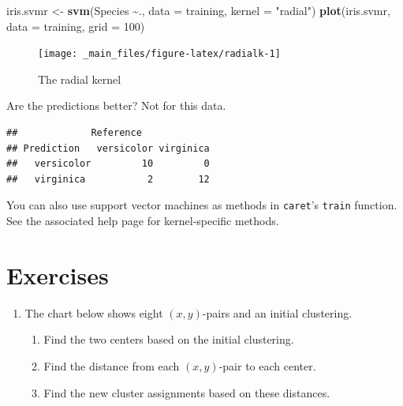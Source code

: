 \documentclass[
]{book}
\newenvironment{Shaded}{\begin{snugshade}}{\end{snugshade}}
\newcommand{\AttributeTok}[1]{\textcolor[rgb]{0.13,0.29,0.53}{#1}}
\newcommand{\DecValTok}[1]{\textcolor[rgb]{0.00,0.00,0.81}{#1}}
\newcommand{\FunctionTok}[1]{\textcolor[rgb]{0.13,0.29,0.53}{\textbf{#1}}}
\newcommand{\NormalTok}[1]{#1}
\newcommand{\OtherTok}[1]{\textcolor[rgb]{0.56,0.35,0.01}{#1}}
\newcommand{\SpecialCharTok}[1]{\textcolor[rgb]{0.81,0.36,0.00}{\textbf{#1}}}
\newcommand{\StringTok}[1]{\textcolor[rgb]{0.31,0.60,0.02}{#1}}
\providecommand{\tightlist}{%
  \setlength{\itemsep}{0pt}\setlength{\parskip}{0pt}}
\theoremstyle{definition}
\theoremstyle{definition}
\theoremstyle{definition}
\theoremstyle{definition}
\theoremstyle{remark}
\begin{document}
\begin{Shaded}
\begin{Highlighting}[]
\NormalTok{iris.svmr }\OtherTok{\textless{}{-}} \FunctionTok{svm}\NormalTok{(Species }\SpecialCharTok{\textasciitilde{}}\NormalTok{., }\AttributeTok{data =}\NormalTok{ training, }\AttributeTok{kernel =} \StringTok{"radial"}\NormalTok{)}
\FunctionTok{plot}\NormalTok{(iris.svmr, }\AttributeTok{data =}\NormalTok{ training, }\AttributeTok{grid =} \DecValTok{100}\NormalTok{)}
\end{Highlighting}
\end{Shaded}

\begin{figure}

{\centering \texttt{[image: \_main\_files/figure-latex/radialk-1]} 

}

\caption{The radial kernel}\label{fig:radialk}
\end{figure}

Are the predictions better? Not for this data.

\begin{Shaded}
\end{Shaded}

\begin{verbatim}
##             Reference
## Prediction   versicolor virginica
##   versicolor         10         0
##   virginica           2        12
\end{verbatim}

You can also use support vector machines as methods in \texttt{caret}'s \texttt{train} function. See the associated help page for kernel-specific methods.

\section{Exercises}\label{exercises-6}

\begin{enumerate}
\def\labelenumi{\arabic{enumi}.}
\tightlist
\item
  The chart below shows eight \((x,y)\)-pairs and an initial clustering.

  \begin{enumerate}
  \def\labelenumii{\alph{enumii}.}
  \tightlist
  \item
    Find the two centers based on the initial clustering.
  \item
    Find the distance from each \((x,y)\)-pair to each center.
  \item
    Find the new cluster assignments based on these distances.
  \end{enumerate}
\end{enumerate}
\end{document}
